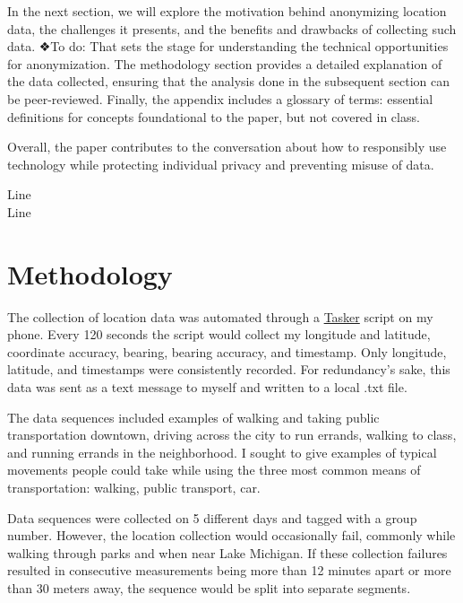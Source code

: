 \documentclass[11pt]{amsart}
\begin{document}
In the next section, we will explore the motivation behind anonymizing location data, the challenges it presents, and the benefits and drawbacks of collecting such data.
❖To do: That sets the stage for understanding the technical opportunities for anonymization.
The methodology section provides a detailed explanation of the data collected, ensuring that the analysis done in the subsequent section can be peer-reviewed.
Finally, the appendix includes a glossary of terms: essential definitions for concepts foundational to the paper, but not covered in class.

Overall, the paper contributes to the conversation about how to responsibly use technology while protecting individual privacy and preventing misuse of data.

{\color{white}Line\\ Line}
\section{Methodology}

The collection of location data was automated through a \href{https://play.google.com/store/apps/details?id=net.dinglisch.android.taskerm&hl=en_US}{Tasker} script on my phone.
Every 120 seconds the script would collect my longitude and latitude, coordinate accuracy, bearing, bearing accuracy, and timestamp.
Only longitude, latitude, and timestamps were consistently recorded.
For redundancy's sake, this data was sent as a text message to myself and written to a local .txt file.

The data sequences included examples of walking and taking public transportation downtown, driving across the city to run errands, walking to class, and running errands in the neighborhood.
I sought to give examples of typical movements people could take while using the three most common means of transportation: walking, public transport, car.

Data sequences were collected on 5 different days and tagged with a group number.
However, the location collection would occasionally fail, commonly while walking through parks and when near Lake Michigan.
If these collection failures resulted in consecutive measurements being more than 12 minutes apart or more than 30 meters away, the sequence would be split into separate segments.
\end{document}
